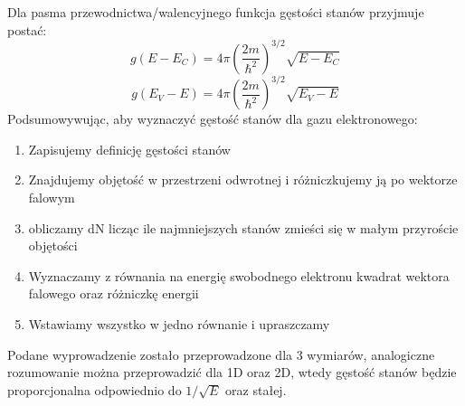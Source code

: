        Dla pasma przewodnictwa/walencyjnego funkcja gęstości stanów przyjmuje postać:
        \begin{equation}
            g(E-E_C) = 4\pi\left(\frac{2m}{\hbar^2}\right)^{3/2}\sqrt{E - E_C} \nonumber
        \end{equation}
        \begin{equation}
            g(E_V - E) = 4\pi\left(\frac{2m}{\hbar^2}\right)^{3/2}\sqrt{E_V - E} \nonumber
        \end{equation}
        Podsumowywując, aby wyznaczyć gęstość stanów dla gazu elektronowego:
        \begin{enumerate}
            \item Zapisujemy definicję gęstości stanów
            \item Znajdujemy objętość w przestrzeni odwrotnej i różniczkujemy ją po wektorze falowym 
            \item obliczamy dN licząc ile najmniejszych stanów zmieści się w małym przyroście objętości
            \item Wyznaczamy z równania na energię swobodnego elektronu kwadrat wektora falowego oraz różniczkę energii
            \item Wstawiamy wszystko w jedno równanie i upraszczamy
        \end{enumerate}    
        Podane wyprowadzenie zostało przeprowadzone dla 3 wymiarów, analogiczne rozumowanie można przeprowadzić dla 1D oraz 2D, wtedy gęstość stanów będzie proporcjonalna odpowiednio do $1/\sqrt{E}$ oraz stałej. 
